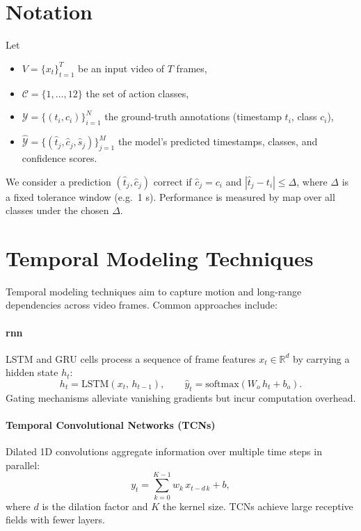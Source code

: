 \section{Notation}
\label{sec:notation}
Let
\begin{itemize}
  \item $V=\{x_t\}_{t=1}^T$ be an input video of $T$ frames,
  \item $\mathcal{C}=\{1,\dots,12\}$ the set of action classes,
  \item $\mathcal{Y}=\{(t_i,c_i)\}_{i=1}^N$ the ground-truth annotations (timestamp $t_i$, class $c_i$),
  \item $\hat{\mathcal{Y}}=\{(\hat t_j,\hat c_j,\hat s_j)\}_{j=1}^M$ the model's predicted timestamps, classes, and confidence scores.
\end{itemize}
We consider a prediction $(\hat t_j,\hat c_j)$ correct if $\hat c_j=c_i$ and $|\hat t_j - t_i|\le\Delta$, where $\Delta$ is a fixed tolerance window (e.g.\ 1 s). Performance is measured by \acrfull{map} over all classes under the chosen $\Delta$.

\section{Temporal Modeling Techniques}
\label{sec:temporal_models}

Temporal modeling techniques aim to capture motion and long-range dependencies across video frames. Common approaches include: 

\paragraph{\acrfull{rnn}}  
LSTM and GRU cells process a sequence of frame features \(x_t\in\mathbb{R}^d\) by carrying a hidden state \(h_t\):
\[
h_t = \mathrm{LSTM}(x_t,\,h_{t-1}), 
\qquad
\hat y_t = \mathrm{softmax}(W_o\,h_t + b_o).
\]
Gating mechanisms alleviate vanishing gradients but incur computation overhead.

\paragraph{Temporal Convolutional Networks (TCNs)}  
Dilated 1D convolutions aggregate information over multiple time steps in parallel:
\[
y_t = \sum_{k=0}^{K-1} w_k\,x_{t - d\,k} + b,
\]
where \(d\) is the dilation factor and \(K\) the kernel size. TCNs achieve large receptive fields with fewer layers.

